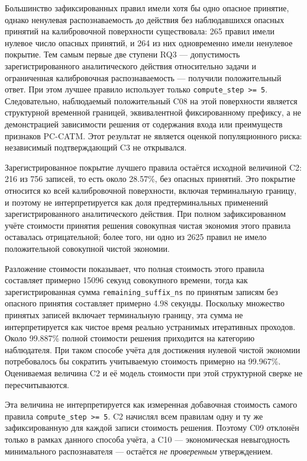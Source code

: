 Большинство зафиксированных правил имели хотя бы одно опасное принятие, однако
ненулевая распознаваемость до действия без наблюдавшихся опасных принятий на
калибровочной поверхности существовала: 265 правил имели нулевое число
опасных принятий, и 264 из них одновременно имели ненулевое покрытие. Тем самым
первые две ступени RQ3 --- допустимость зарегистрированного аналитического
действия относительно задачи и ограниченная калибровочная распознаваемость ---
получили положительный ответ. При этом лучшее правило использует только
\texttt{compute\_step >= 5}. Следовательно, наблюдаемый положительный C08 на
этой поверхности является структурной временной границей, эквивалентной
фиксированному префиксу, а не демонстрацией зависимости решения от содержания
входа или преимуществ признаков PC-CATM. Этот результат не является оценкой
популяционного риска: независимый подтверждающий C3 не открывался.



Зарегистрированное покрытие лучшего правила остаётся исходной величиной C2:
216 из 756 записей, то есть около 28.57\%, без опасных принятий. Это покрытие
относится ко всей калибровочной поверхности, включая терминальную границу, и
поэтому не интерпретируется как доля предтерминальных применений зарегистрированного аналитического действия. При
полном зафиксированном учёте стоимости принятия решения совокупная чистая
экономия этого правила оставалась отрицательной; более того, ни одно из 2625
правил не имело положительной совокупной чистой экономии.

Разложение стоимости показывает, что полная стоимость этого правила составляет
примерно 15096 секунд совокупного времени, тогда как зарегистрированная сумма
\texttt{remaining\_suffix\_ns} по принятым записям без опасного принятия составляет
примерно 4.98 секунды. Поскольку множество принятых записей включает терминальную
границу, эта сумма не интерпретируется как чистое время реально устранимых
итеративных проходов. Около 99.887\% полной стоимости решения приходится на
категорию наблюдателя. При таком способе учёта для достижения нулевой чистой
экономии потребовалось бы сократить учитываемую стоимость примерно на
99.967\%. Оцениваемая величина C2 и её модель стоимости при этой структурной
сверке не пересчитываются.

Эта величина не интерпретируется как измеренная добавочная стоимость самого
правила \texttt{compute\_step >= 5}. C2 начислял всем правилам одну и ту же
зафиксированную для каждой записи стоимость решения. Поэтому C09 отклонён
только в рамках данного способа учёта, а C10 --- экономическая невыгодность
минимального распознавателя --- остаётся \emph{не проверенным} утверждением.


